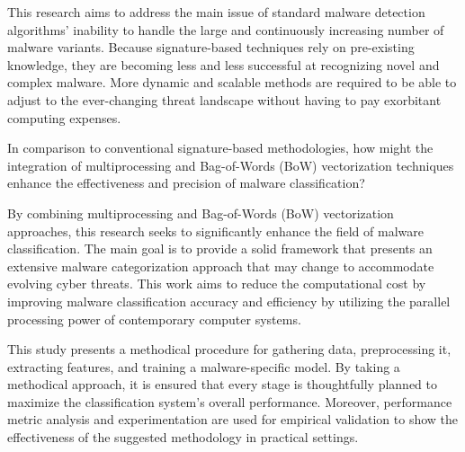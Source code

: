 \documentclass[conference]{IEEEtran}
\begin{document}
This research aims to address the main issue of standard malware detection algorithms' inability to handle the large and continuously increasing number of malware variants. Because signature-based techniques rely on pre-existing knowledge, they are becoming less and less successful at recognizing novel and complex malware. More dynamic and scalable methods are required to be able to adjust to the ever-changing threat landscape without having to pay exorbitant computing expenses.

In comparison to conventional signature-based methodologies, how might the integration of multiprocessing and Bag-of-Words (BoW) vectorization techniques enhance the effectiveness and precision of malware classification?

By combining multiprocessing and Bag-of-Words (BoW) vectorization approaches, this research seeks to significantly enhance the field of malware classification. The main goal is to provide a solid framework that presents an extensive malware categorization approach that may change to accommodate evolving cyber threats. This work aims to reduce the computational cost by improving malware classification accuracy and efficiency by utilizing the parallel processing power of contemporary computer systems.

This study presents a methodical procedure for gathering data, preprocessing it, extracting features, and training a malware-specific model. By taking a methodical approach, it is ensured that every stage is thoughtfully planned to maximize the classification system's overall performance. Moreover, performance metric analysis and experimentation are used for empirical validation to show the effectiveness of the suggested methodology in practical settings.
\end{document}
